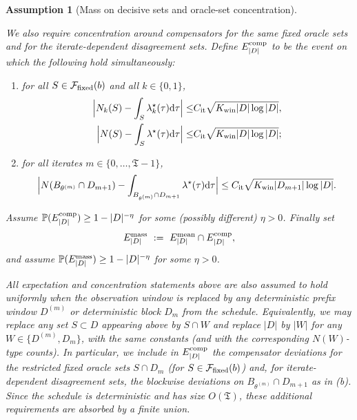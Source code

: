 \documentclass{statsoc}
\newtheorem{assumption}[assumption]{Assumption}
\newcommand{\bbP}{\mathbb{P}}
\newcommand{\dd}{\mathrm{d}}
\newcommand{\1}{\mathbbm{1}}
\newcommand{\Tmax}{\mathfrak{T}}
\begin{document}
\begin{assumption}[Mass on decisive sets and oracle-set concentration]
\begin{enumerate}[nosep,label=(\roman*)]
We also require concentration around compensators for the same fixed oracle sets and for the iterate-dependent disagreement sets.
Define $E^{\rm comp}_{|D|}$ to be the event on which the following hold simultaneously:
\begin{enumerate}[nosep,label=(\alph*)]
\item for all $S\in\mathcal F_{\rm fixed}(b)$ and all $k\in\{0,1\}$,
\begin{align*}
    \Big|N_k(S)-\int_S \lambda_k^\star(\tau)\dd\tau\Big|
\le& C_{\rm it}\sqrt{K_{\rm win}|D|\log|D|},\\
\Big|N(S)-\int_S\lambda^\star(\tau)\dd\tau\Big|
\le& C_{\rm it}\sqrt{K_{\rm win}|D|\log|D|};
\end{align*}

\item for all iterates $m\in\{0,\dots,\Tmax-1\}$,
\[
\Big|N(B_{\theta^{(m)}}\cap D_{m+1})
-\int_{B_{\theta^{(m)}}\cap D_{m+1}}\lambda^\star(\tau)\dd\tau\Big|
\le C_{\rm it}\sqrt{K_{\rm win}|D_{m+1}|\log|D|}.
\]

\end{enumerate}
Assume $\bbP(E^{\rm comp}_{|D|})\ge 1-|D|^{-\eta}$ for some (possibly different) $\eta>0$. Finally set
\[
E^{\rm mass}_{|D|}\ :=\ E^{\rm mean}_{|D|}\cap E^{\rm comp}_{|D|},
\]
and assume $\bbP(E^{\rm mass}_{|D|})\ge 1-|D|^{-\eta}$ for some $\eta>0$.

\end{enumerate}

All expectation and concentration statements above are also assumed to hold uniformly when the observation
window is replaced by any deterministic prefix window $D^{(m)}$ or deterministic block $D_m$ from the schedule.
Equivalently, we may replace any set $S\subset D$ appearing above by $S\cap W$ and replace $|D|$ by $|W|$ for any
$W\in\{D^{(m)},D_m\}$, with the same constants (and with the corresponding $N(W)$-type counts).
In particular, we include in $E^{\rm comp}_{|D|}$ the compensator deviations for the restricted fixed oracle sets $S\cap D_m$ (for $S\in\mathcal F_{\rm fixed}(b)$) and, for iterate-dependent disagreement sets, the blockwise deviations on $B_{\theta^{(m)}}\cap D_{m+1}$ as in (b). Since the schedule is deterministic and has size $O(\Tmax)$, these additional requirements are absorbed by a finite union.

\end{assumption}
\end{document}
